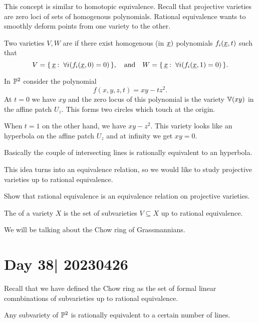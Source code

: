 \documentclass[12pt]{memoir}
\begin{document}
This concept is similar to homotopic equivalence. Recall that projective varieties are zero loci of sets of homogenous polynomials. Rational equivalence wants to smoothly deform points from one variety to the other.

\begin{Def}
    Two varieties $V,W$ are  if there exist homogenous (in $\underline x)$ polynomials $f_i(\underline x,t)$ such that 
    $$V=\{\,\underline x\mathbin{:}\ \forall i(f_i(\underline x,0)=0)\,\},\quad\text{and}\quad W=\{\,\underline x\mathbin{:}\ \forall i(f_i(\underline x,1)=0)\,\}.$$
\end{Def}

\begin{Ex}
    In $\mathbb{P}^2$ consider the polynomial 
    $$f(x,y,z,t)=xy-tz^2.$$
    At $t=0$ we have $xy$ and the zero locus of this polynomial is the variety $\mathbb{V}(xy)$ in the affine patch $U_z$. This forms two circles which touch at the origin.\par 
    When $t=1$ on the other hand, we have $xy-z^2$. This variety looks like an hyperbola on the affine patch $U_z$ and at infinity we get $xy=0$.\par 
    Basically the couple of intersecting lines is rationally equivalent to an hyperbola.
\end{Ex}

This idea turns into an equivalence relation, so we would like to study projective varieties up to rational equivalence.

\begin{Ex}
    Show that rational equivalence is an equivalence relation on projective varieties.
\end{Ex}

\begin{Def}
    The  of a variety $X$ is the set of subvarieties $V\subseteq X$ up to rational equivalence.
\end{Def}

We will be talking about the Chow ring of Grassmannians.

\section{Day 38| 20230426}

Recall that we have defined the Chow ring as the set of formal linear comnbinations of subvarieties up to rational equivalence. 

\begin{Ej}
    Any subvariety of $\mathbb{P}^2$ is rationally equivalent to a certain number of lines.
\end{Ej}
\end{document}
